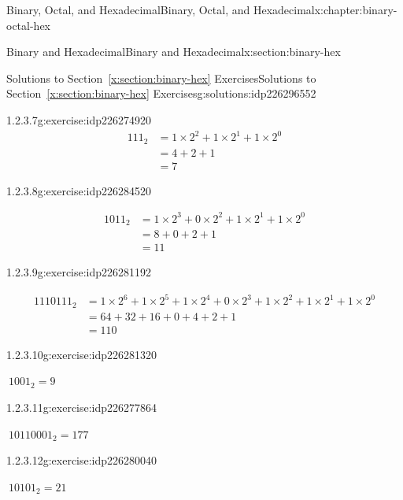 \documentclass[twoside,10pt,]{book}
\newcommand{\xreffont}{\relax}
\numberwithin{equation}{section}
\newcommand{\amp}{&}
\begin{document}
\begin{chapterptx}{Binary, Octal, and Hexadecimal}{}{Binary, Octal, and Hexadecimal}{}{}{x:chapter:binary-octal-hex}
\begin{sectionptx}{Binary and Hexadecimal}{}{Binary and Hexadecimal}{}{}{x:section:binary-hex}
\begin{solutions-subsection}{Solutions to Section~{\xreffont\ref*{x:section:binary-hex}} Exercises}{}{Solutions to Section~{\xreffont\ref*{x:section:binary-hex}} Exercises}{}{}{g:solutions:idp226296552}
\begin{exercisegroup}
\begin{divisionsolutioneg}{1.2.3.7}{}{g:exercise:idp226274920}
\begin{align*}
111_2 \amp = 1\times2^2+1\times2^1+1\times2^0\\
\amp = 4+2+1\\
\amp = 7
\end{align*}
\end{divisionsolutioneg}%
\begin{divisionsolutioneg}{1.2.3.8}{}{g:exercise:idp226284520}%
\par\smallskip%
\noindent\hypertarget{g:solution:idp226283496-main}{}%
\begin{align*}
1011_2 \amp = 1\times2^3+0\times2^2+1\times2^1+1\times2^0\\
\amp = 8+0+2+1\\
\amp = 11
\end{align*}
\end{divisionsolutioneg}%
\begin{divisionsolutioneg}{1.2.3.9}{}{g:exercise:idp226281192}%
\par\smallskip%
\noindent\hypertarget{g:solution:idp226277992-main}{}%
\begin{align*}
1110111_2 \amp = 1\times2^6+1\times2^5+1\times2^4+0\times2^3+1\times2^2+1\times2^1+1\times2^0\\
\amp = 64+32+16+0+4+2+1\\
\amp = 110
\end{align*}
\end{divisionsolutioneg}%
\end{exercisegroup}
\par\medskip\noindent
\begin{exercisegroup}
\begin{divisionsolutioneg}{1.2.3.10}{}{g:exercise:idp226281320}%
\par\smallskip%
\noindent\hypertarget{g:solution:idp226282728-main}{}\(\ 1001_2=9\)\end{divisionsolutioneg}%
\begin{divisionsolutioneg}{1.2.3.11}{}{g:exercise:idp226277864}%
\par\smallskip%
\noindent\hypertarget{g:solution:idp226285032-main}{}\(\ 10110001_2=177\)\end{divisionsolutioneg}%
\begin{divisionsolutioneg}{1.2.3.12}{}{g:exercise:idp226280040}%
\par\smallskip%
\noindent\hypertarget{g:solution:idp226278248-main}{}\(\ 10101_2=21\)\end{divisionsolutioneg}%
\end{exercisegroup}

\end{solutions-subsection}
\end{sectionptx}
\end{chapterptx}
\end{document}
